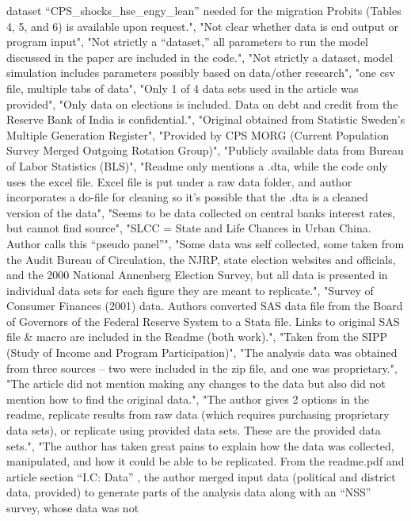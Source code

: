 \documentclass[]{article}
\begin{document}
\begin{itemize}
  dataset ``CPS\_shocks\_hse\_engy\_lean'' needed for the migration
  Probits (Tables 4, 5, and 6) is available upon request.", "Not clear
  whether data is end output or program input", "Not strictly a
  ``dataset,'' all parameters to run the model discussed in the paper
  are included in the code.", "Not strictly a dataset, model simulation
  includes parameters possibly based on data/other research", "one csv
  file, multiple tabs of data", "Only 1 of 4 data sets used in the
  article was provided", "Only data on elections is included. Data on
  debt and credit from the Reserve Bank of India is confidential.",
  "Original obtained from Statistic Sweden's Multiple Generation
  Register", "Provided by CPS MORG (Current Population Survey Merged
  Outgoing Rotation Group)", "Publicly available data from Bureau of
  Labor Statistics (BLS)", "Readme only mentions a .dta, while the code
  only uses the excel file. Excel file is put under a raw data folder,
  and author incorporates a do-file for cleaning so it's possible that
  the .dta is a cleaned version of the data", "Seems to be data
  collected on central banks interest rates, but cannot find source",
  "SLCC = State and Life Chances in Urban China. Author calls this
  ``pseudo panel''", "Some data was self collected, some taken from the
  Audit Bureau of Circulation, the NJRP, state election websites and
  officials, and the 2000 National Annenberg Election Survey, but all
  data is presented in individual data sets for each figure they are
  meant to replicate.", "Survey of Consumer Finances (2001) data.
  Authors converted SAS data file from the Board of Governors of the
  Federal Reserve System to a Stata file. Links to original SAS file \&
  macro are included in the Readme (both work).", "Taken from the SIPP
  (Study of Income and Program Participation)", "The analysis data was
  obtained from three sources -- two were included in the zip file, and
  one was proprietary.", "The article did not mention making any changes
  to the data but also did not mention how to find the original data.",
  "The author gives 2 options in the readme, replicate results from raw
  data (which requires purchasing proprietary data sets), or replicate
  using provided data sets. These are the provided data sets.", "The
  author has taken great pains to explain how the data was collected,
  manipulated, and how it could be able to be replicated. From the
  readme.pdf and article section ``I.C: Data'' , the author merged input
  data (political and district data, provided) to generate parts of the
  analysis data along with an ``NSS'' survey, whose data was not

\end{itemize}
\end{document}
